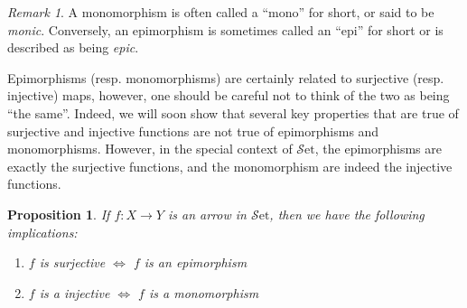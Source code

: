 \documentclass[10pt,oneside]{book}
\def\~#1{\mathscr{#1}}
\newcommand{\Set}{\~S\mathrm{et}}
\theoremstyle{plain}
\newtheorem{prop}[thm]{Proposition}
\theoremstyle{definition}
\theoremstyle{remark}
\newtheorem*{rmk}{Remark}
\numberwithin{equation}{section}
\numberwithin{figure}{section}
\begin{document}
\begin{rmk}
    A monomorphism is often called a ``mono'' for short, or said to be \emph{monic}. Conversely, an epimorphism is sometimes called an ``epi'' for short or is described as being \emph{epic}.
\end{rmk}

Epimorphisms (resp. monomorphisms) are certainly related to surjective (resp. injective) maps, however, one should be careful not to think of the two as being ``the same''. Indeed, we will soon show that several key properties that are true of surjective and injective functions are not true of epimorphisms and monomorphisms. However, in the special context of $\Set$, the epimorphisms are exactly the surjective functions, and the monomorphism are indeed the injective functions. 

\begin{prop}
\label{prop:set_surjective_epi}
    If $f: X \to Y$ is an arrow in \textup{$\Set$}, then we have the following implications:
    \begin{enumerate}[label=(\roman*)]
        \item $f$ is surjective $\iff$ $f$ is an epimorphism
        \item $f$ is a injective $\iff$ $f$ is a monomorphism
    \end{enumerate}
\end{prop}
\end{document}
